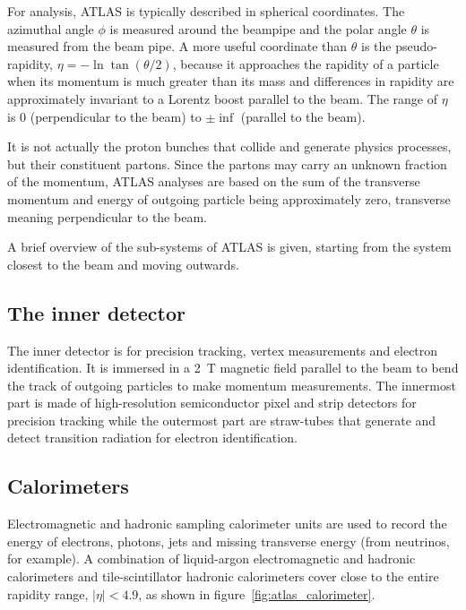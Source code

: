 For analysis, ATLAS is typically described in spherical coordinates. The azimuthal angle $\phi$ is measured around the beampipe and the polar angle $\theta$ is measured from the beam pipe. A more useful coordinate than $\theta$ is the pseudo-rapidity, $\eta = -\ln\tan\left(\theta/2\right)$, because it approaches the rapidity of a particle when its momentum is much greater than its mass and differences in rapidity are approximately invariant to a Lorentz boost parallel to the beam. The range of $\eta$ is 0 (perpendicular to the beam) to $\pm\inf$ (parallel to the beam).

It is not actually the proton bunches that collide and generate physics processes, but their constituent partons. Since the partons may carry an unknown fraction of the momentum, ATLAS analyses are based on the sum of the transverse momentum and energy of outgoing particle being approximately zero, transverse meaning perpendicular to the beam.

A brief overview of the sub-systems of ATLAS is given, starting from the system closest to the beam and moving outwards. 

\subsection{The inner detector}
The inner detector is for precision tracking, vertex measurements and electron identification. It is immersed in a \SI{2}{\tesla} magnetic field parallel to the beam to bend the track of outgoing particles to make momentum measurements. The innermost part is made of high-resolution semiconductor pixel and strip detectors for precision tracking while the outermost part are straw-tubes that generate and detect transition radiation for electron identification.

\subsection{Calorimeters}
Electromagnetic and hadronic sampling calorimeter units are used to record the energy of electrons, photons, jets and missing transverse energy (from neutrinos, for example). A combination of liquid-argon electromagnetic and hadronic calorimeters and tile-scintillator hadronic calorimeters cover close to the entire rapidity range, $|\eta| < 4.9$, as shown in figure~\ref{fig:atlas_calorimeter}.

